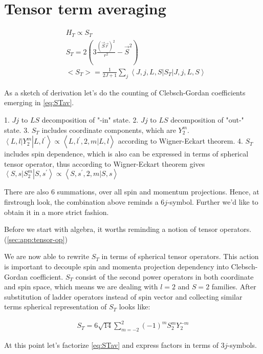\section{Tensor term averaging} \label{sec:app:tensor-term}

\begin{align}
    &H_T \propto S_T \\
    &S_T = 2(3\frac{(\vec{S}\vec{r})^2}{r^2} - \vec{S}^2) \\
    &<S_T> = \frac{1}{2J+1} \sum_{j} \left<J, j, L, S\right| S_T \left|J, j, L, S\right> \label{eq:STav}
\end{align}

As a sketch of derivation let's do the counting of Clebsch-Gordan coefficients
emerging in \cref{eq:STav}.

1. $Jj$ to $LS$ decomposition of "-in" state.
2. $Jj$ to $LS$ decomposition of "out-" state.
3. $S_T$ includes coordinate components, which are $Y_2^m$.
$\left<L, l\right| Y_2^m \left|L,l^\prime\right> \propto \left<L, l^\prime, 2, m| L, l \right>$
according to Wigner-Eckart theorem.
4. $S_T$ includes spin dependence, which is also can be expressed in terms of
spherical tensor operator, thus according to Wigner-Eckart theorem gives
$\left<S, s\right| S_{2}^m \left|S, s^\prime \right> \propto \left<S, s^\prime, 2, m| S, s\right>$

There are also $6$ summations, over all spin and momentum projections.
Hence, at firstrough look, the combination above reminds a $6j$-symbol.
Further we'd like to obtain it in a more strict fashion.

Before we start with algebra, it worths reminding a notion of tensor operators.(\cref{sec:app:tensor-op})

We are now able to rewrite $S_T$ in terms of spherical tensor operators.
This action is important to decouple spin and momenta projection dependency
into Clebsch-Gordan coefficient. $S_T$ consist of the second power operators
in both coordinate and spin space, which means we are dealing
with $l=2$ and $S=2$ families. After substitution of ladder operators
instead of spin vector and collecting similar terms spherical representation
of $S_T$ looks like:

\begin{align}
    S_T = 6 \sqrt{14} \sum_{m=-2}^{2} (-1)^m S_{2}^{m} Y_{2}^{-m}
\end{align}

At this point let's factorize \cref{eq:STav} and express factors in terms
of $3j$-symbols.

